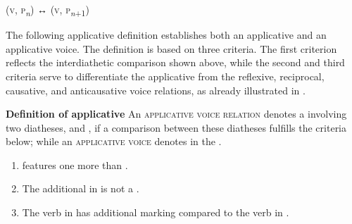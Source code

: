 \smallskip

\noindent
\begin{center}
	 (\textsc{v}, \textsc{p}\textsubscript{\textit{n}}) ↔  (\textsc{v}, \textsc{p}\textsubscript{\textit{n}+1})
\end{center}

\smallskip

The following applicative definition establishes both an applicative  and an applicative voice. The definition is based on three criteria. The first criterion reflects the interdiathetic comparison shown above, while the second and third criteria serve to differentiate the applicative  from the reflexive, reciprocal, causative, and anticausative voice relations, as already illustrated in . 

\smallskip

\noindent
\begin{center} \label{def:applicative}
	\begin{minipage}{0.80\textwidth}
		\textbf{Definition of applicative} \newline
		An \textsc{applicative voice relation} denotes a  involving two diatheses,  and , if a comparison between these diatheses fulfills the criteria below; while an \textsc{applicative voice} denotes  in the .
		\begin{enumerate}[label=\roman*)]
			\item {} features one  more than .
			\item The additional  in  is not a .
			\item The verb in  has additional marking compared to the verb in .
		\end{enumerate}
	\end{minipage}
\end{center}

\smallskip

